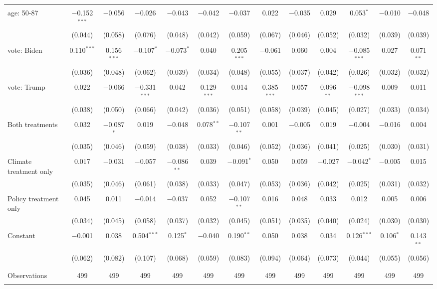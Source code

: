 \begin{tabular}{@{\extracolsep{5pt}}lcccccccccccc}
  & & & & & & & & & & & & \\ 
 age: 50-87 & $-$0.152$^{***}$ & $-$0.056 & $-$0.026 & $-$0.043 & $-$0.042 & $-$0.037 & 0.022 & $-$0.035 & 0.029 & 0.053$^{*}$ & $-$0.010 & $-$0.048 \\ 
  & (0.044) & (0.058) & (0.076) & (0.048) & (0.042) & (0.059) & (0.067) & (0.046) & (0.052) & (0.032) & (0.039) & (0.039) \\ 
  & & & & & & & & & & & & \\ 
 vote: Biden & 0.110$^{***}$ & 0.156$^{***}$ & $-$0.107$^{*}$ & $-$0.073$^{*}$ & 0.040 & 0.205$^{***}$ & $-$0.061 & 0.060 & 0.004 & $-$0.085$^{***}$ & 0.027 & 0.071$^{**}$ \\ 
  & (0.036) & (0.048) & (0.062) & (0.039) & (0.034) & (0.048) & (0.055) & (0.037) & (0.042) & (0.026) & (0.032) & (0.032) \\ 
  & & & & & & & & & & & & \\ 
 vote: Trump & 0.022 & $-$0.066 & $-$0.331$^{***}$ & 0.042 & 0.129$^{***}$ & 0.014 & 0.385$^{***}$ & 0.057 & 0.096$^{**}$ & $-$0.098$^{***}$ & 0.009 & 0.011 \\ 
  & (0.038) & (0.050) & (0.066) & (0.042) & (0.036) & (0.051) & (0.058) & (0.039) & (0.045) & (0.027) & (0.033) & (0.034) \\ 
  & & & & & & & & & & & & \\ 
 Both treatments & 0.032 & $-$0.087$^{*}$ & 0.019 & $-$0.048 & 0.078$^{**}$ & $-$0.107$^{**}$ & 0.001 & $-$0.005 & 0.019 & $-$0.004 & $-$0.016 & 0.004 \\ 
  & (0.035) & (0.046) & (0.059) & (0.038) & (0.033) & (0.046) & (0.052) & (0.036) & (0.041) & (0.025) & (0.030) & (0.031) \\ 
  & & & & & & & & & & & & \\ 
 Climate treatment only & 0.017 & $-$0.031 & $-$0.057 & $-$0.086$^{**}$ & 0.039 & $-$0.091$^{*}$ & 0.050 & 0.059 & $-$0.027 & $-$0.042$^{*}$ & $-$0.005 & 0.015 \\ 
  & (0.035) & (0.046) & (0.061) & (0.038) & (0.033) & (0.047) & (0.053) & (0.036) & (0.042) & (0.025) & (0.031) & (0.032) \\ 
  & & & & & & & & & & & & \\ 
 Policy treatment only & 0.045 & 0.011 & $-$0.014 & $-$0.037 & 0.052 & $-$0.107$^{**}$ & 0.016 & 0.048 & 0.033 & 0.012 & 0.005 & 0.006 \\ 
  & (0.034) & (0.045) & (0.058) & (0.037) & (0.032) & (0.045) & (0.051) & (0.035) & (0.040) & (0.024) & (0.030) & (0.030) \\ 
  & & & & & & & & & & & & \\ 
 Constant & $-$0.001 & 0.038 & 0.504$^{***}$ & 0.125$^{*}$ & $-$0.040 & 0.190$^{**}$ & 0.050 & 0.038 & 0.034 & 0.126$^{***}$ & 0.106$^{*}$ & 0.143$^{**}$ \\ 
  & (0.062) & (0.082) & (0.107) & (0.068) & (0.059) & (0.083) & (0.094) & (0.064) & (0.073) & (0.044) & (0.055) & (0.056) \\ 
  & & & & & & & & & & & & \\ 
\hline \\[-1.8ex] 

Observations & 499 & 499 & 499 & 499 & 499 & 499 & 499 & 499 & 499 & 499 & 499 & 499 \\ 
\hline 
\hline \\[-1.8ex] 
\end{tabular} 